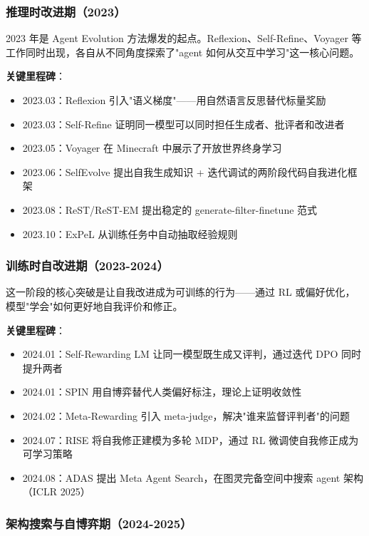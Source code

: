\subsubsection{推理时改进期（2023）}

2023 年是 Agent Evolution 方法爆发的起点。Reflexion、Self-Refine、Voyager 等工作同时出现，各自从不同角度探索了"agent 如何从交互中学习"这一核心问题。

\textbf{关键里程碑}：
\begin{itemize}
\item 2023.03：Reflexion 引入"语义梯度"——用自然语言反思替代标量奖励
\item 2023.03：Self-Refine 证明同一模型可以同时担任生成者、批评者和改进者
\item 2023.05：Voyager 在 Minecraft 中展示了开放世界终身学习
\item 2023.06：SelfEvolve 提出自我生成知识 + 迭代调试的两阶段代码自我进化框架
\item 2023.08：ReST/ReST-EM 提出稳定的 generate-filter-finetune 范式
\item 2023.10：ExPeL 从训练任务中自动抽取经验规则
\end{itemize}

\subsubsection{训练时自改进期（2023-2024）}

这一阶段的核心突破是让自我改进成为可训练的行为——通过 RL 或偏好优化，模型"学会"如何更好地自我评价和修正。

\textbf{关键里程碑}：
\begin{itemize}
\item 2024.01：Self-Rewarding LM 让同一模型既生成又评判，通过迭代 DPO 同时提升两者
\item 2024.01：SPIN 用自博弈替代人类偏好标注，理论上证明收敛性
\item 2024.02：Meta-Rewarding 引入 meta-judge，解决"谁来监督评判者"的问题
\item 2024.07：RISE 将自我修正建模为多轮 MDP，通过 RL 微调使自我修正成为可学习策略
\item 2024.08：ADAS 提出 Meta Agent Search，在图灵完备空间中搜索 agent 架构（ICLR 2025）
\end{itemize}

\subsubsection{架构搜索与自博弈期（2024-2025）}

